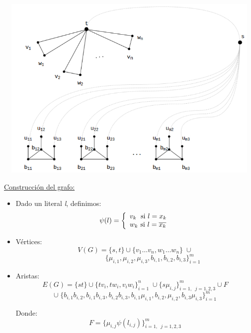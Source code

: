 \documentclass[12pt,a4paper]{report}
\begin{document}
  			\begin{center}
          			\includegraphics[width=14cm, height=9cm]{./graphics/3color_npcomplete.jpg}
  			\end{center}

  			\vspace{3mm}
  			\underline{Construcción del grafo:}
  				\begin{itemize}
  					\item Dado un literal \textit{l}, definimos:
  						\begin{equation*}
  							\psi(l) =
  	  					\left \lbrace
  			  			\begin{array}{l}
  	    				 	v_{k} \; \textup{ si } l = x_{k} \\
  	    		 			w_{k} \textup{ si } l = \overline{x_{k}}
  			  			\end{array}
  	  					\right.
  						\end{equation*}
  					\item Vértices:
  						\[ V(G) = \lbrace s, t \rbrace \cup \lbrace v_{1} \dotsc v_{n}, w_{1} \dotsc w_{n} \rbrace \; \cup \]
  						\[ \qquad \qquad \; \; \; \; \lbrace \mu_{i, 1}, \mu_{i, 2}, \mu_{i, 3}, b_{i, 1}, b_{i, 2}, b_{i, 3} \rbrace_{i = 1}^{m}  \]
  					\item Aristas:
  						\[ E(G) = \lbrace s t \rbrace \cup \lbrace t v_{i}, t w_{i}, v_{i} w_{i} \rbrace_{i = 1}^{n} \; \cup \lbrace s \mu_{i, j} \rbrace_{i = 1, \; \; j = 1, 2, 3}^{m} \cup F \]
  						\[ \cup \; \lbrace b_{i, 1} b_{i, 2}, b_{i, 1} b_{i, 3}, b_{i, 2} b_{i, 3}, b_{i, 1} \mu_{i, 1}, b_{i, 2}, \mu_{i, 2}, b_{i, 3} \mu_{i, 3} \rbrace_{i = 1}^{m}\]
  						\par Donde:
  						\[ F = \lbrace \mu_{i, j} \psi(l_{i, j}) \rbrace_{i = 1, \; \; j = 1, 2, 3}^{m}\]
  				\end{itemize}
\end{document}
